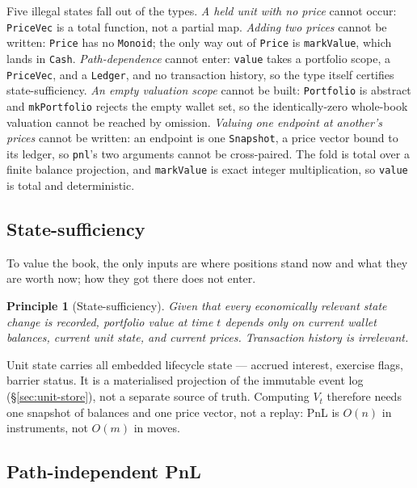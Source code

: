 \documentclass[11pt,a4paper]{article}
\newtheorem{principle}[definition]{Principle}
\begin{document}
\noindent Five illegal states fall out of the types. \emph{A held unit with no price} cannot occur: \texttt{PriceVec} is a total function, not a partial map. \emph{Adding two prices} cannot be written: \texttt{Price} has no \texttt{Monoid}; the only way out of \texttt{Price} is \texttt{markValue}, which lands in \texttt{Cash}. \emph{Path-dependence} cannot enter: \texttt{value} takes a portfolio scope, a \texttt{PriceVec}, and a \texttt{Ledger}, and no transaction history, so the type itself certifies state-sufficiency. \emph{An empty valuation scope} cannot be built: \texttt{Portfolio} is abstract and \texttt{mkPortfolio} rejects the empty wallet set, so the identically-zero whole-book valuation cannot be reached by omission. \emph{Valuing one endpoint at another's prices} cannot be written: an endpoint is one \texttt{Snapshot}, a price vector bound to its ledger, so \texttt{pnl}'s two arguments cannot be cross-paired. The fold is total over a finite balance projection, and \texttt{markValue} is exact integer multiplication, so \texttt{value} is total and deterministic.

\subsection{State-sufficiency}

\noindent To value the book, the only inputs are where positions stand now and what they are worth now; how they got there does not enter.

\begin{principle}[State-sufficiency]
\label{prin:state-sufficiency}
Given that every economically relevant state change is recorded, portfolio value at time $t$ depends only on current wallet balances, current unit state, and current prices. Transaction history is irrelevant.
\end{principle}

\noindent Unit state carries all embedded lifecycle state --- accrued interest, exercise flags, barrier status. It is a materialised projection of the immutable event log (\S\ref{sec:unit-store}), not a separate source of truth. Computing $V_t$ therefore needs one snapshot of balances and one price vector, not a replay: PnL is $O(n)$ in instruments, not $O(m)$ in moves.

\subsection{Path-independent PnL}
\end{document}
